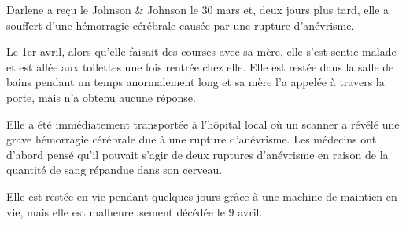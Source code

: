 Darlene a reçu le Johnson \& Johnson le 30 mars et, deux jours plus tard, elle a
souffert d'une hémorragie cérébrale causée par une rupture d'anévrisme.

Le 1er avril, alors qu'elle faisait des courses avec sa mère, elle s'est sentie
malade et est allée aux toilettes une fois rentrée chez elle. Elle est restée
dans la salle de bains pendant un temps anormalement long et sa mère l'a appelée
à travers la porte, mais n'a obtenu aucune réponse.

Elle a été immédiatement transportée à l'hôpital local où un scanner a révélé
une grave hémorragie cérébrale due à une rupture d'anévrisme. Les médecins ont
d'abord pensé qu'il pouvait s'agir de deux ruptures d'anévrisme en raison de la
quantité de sang répandue dans son cerveau.

Elle est restée en vie pendant quelques jours grâce à une machine de maintien en
vie, mais elle est malheureusement décédée le 9 avril.

